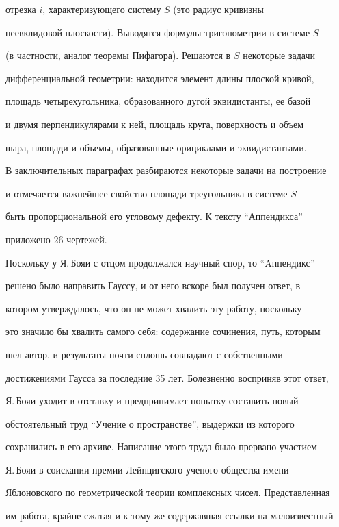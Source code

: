 отрезка $i$, характеризующего систему $S$ (это радиус кривизны 


неевклидовой плоскости). Выводятся формулы тригонометрии в системе $S$


(в частности, аналог теоремы Пифагора). Решаются в $S$ некоторые задачи 


дифференциальной геометрии: находится элемент длины плоской кривой, 


площадь четырехугольника, образованного дугой эквидистанты, ее базой 


и двумя перпендикулярами к ней, площадь круга, поверхность и объем 


шара, площади и объемы, образованные орициклами и эквидистантами. 


В заключительных параграфах разбираются некоторые задачи на построение 


и отмечается важнейшее свойство площади треугольника в системе $S$


быть пропорциональной его угловому дефекту. К тексту ``Аппендикса''


приложено 26 чертежей.





Поскольку у Я.\,Бояи с отцом продолжался научный спор, то ``Aппендикс''


решено было направить Гауссу, и от него вскоре был получен ответ, в 


котором утверждалось, что он не может хвалить эту работу, поскольку 


это значило бы хвалить самого себя: содержание сочинения, путь, которым 


шел автор, и результаты почти сплошь совпадают с собственными 


достижениями Гаусса за последние 35 лет. Болезненно восприняв этот ответ, 


Я.\,Бояи уходит в отставку и предпринимает попытку составить новый 


обстоятельный труд ``Учение о пространстве'', выдержки из которого 


сохранились в его архиве. Написание этого труда было прервано участием 


Я.\,Бояи в соискании премии Лейпцигского ученого общества имени 


Яблоновского по геометрической теории комплексных чисел. Представленная 


им работа, крайне сжатая и к тому же содержавшая ссылки на малоизвестный


